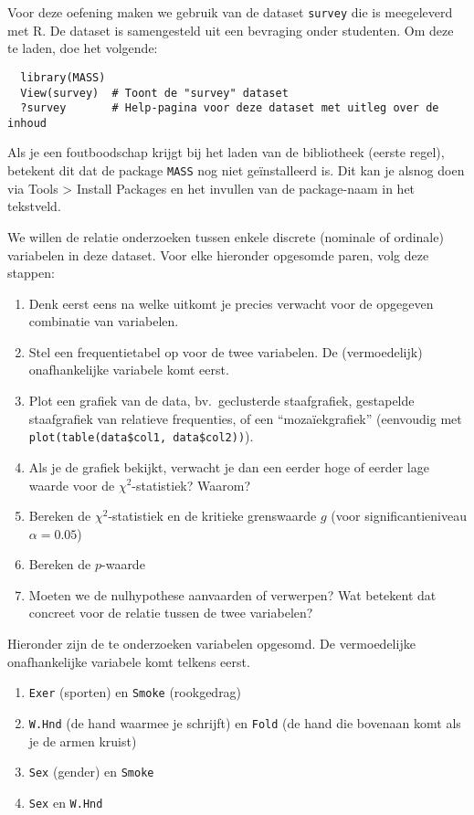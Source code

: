 \begin{exercise}
  \label{ex:chisq-survey}
  Voor deze oefening maken we gebruik van de dataset \texttt{survey} die is meegeleverd met R. De dataset is samengesteld uit een bevraging onder studenten. Om deze te laden, doe het volgende:
  
  \begin{lstlisting}
  library(MASS)
  View(survey)  # Toont de "survey" dataset
  ?survey       # Help-pagina voor deze dataset met uitleg over de inhoud
  \end{lstlisting}
  
  Als je een foutboodschap krijgt bij het laden van de bibliotheek (eerste regel), betekent dit dat de package \texttt{MASS} nog niet geïnstalleerd is. Dit kan je alsnog doen via Tools > Install Packages en het invullen van de package-naam in het tekstveld.
  
  We willen de relatie onderzoeken tussen enkele discrete (nominale of ordinale) variabelen in deze dataset. Voor elke hieronder opgesomde paren, volg deze stappen:
  
  \begin{enumerate}[label=(\alph*)]
    \item Denk eerst eens na welke uitkomt je precies verwacht voor de opgegeven combinatie van variabelen.
    \item Stel een frequentietabel op voor de twee variabelen. De (vermoedelijk) onafhankelijke variabele komt eerst.
    \item Plot een grafiek van de data, bv.~geclusterde staafgrafiek, gestapelde staafgrafiek van relatieve frequenties, of een ``mozaïekgrafiek'' (eenvoudig met \texttt{plot(table(data\$col1, data\$col2))}).
    \item Als je de grafiek bekijkt, verwacht je dan een eerder hoge of eerder lage waarde voor de $\chi^2$-statistiek? Waarom?
    \item Bereken de $\chi^2$-statistiek en de kritieke grenswaarde $g$ (voor significantieniveau $\alpha = 0.05$)
    \item Bereken de $p$-waarde
    \item Moeten we de nulhypothese aanvaarden of verwerpen? Wat betekent dat concreet voor de relatie tussen de twee variabelen?
  \end{enumerate}

  Hieronder zijn de te onderzoeken variabelen opgesomd. De vermoedelijke onafhankelijke variabele komt telkens eerst.
  
  \begin{enumerate}
    \item \texttt{Exer} (sporten) en \texttt{Smoke} (rookgedrag)
    \item \texttt{W.Hnd} (de hand waarmee je schrijft) en \texttt{Fold} (de hand die bovenaan komt als je de armen kruist)
    \item \texttt{Sex} (gender) en \texttt{Smoke}
    \item \texttt{Sex} en \texttt{W.Hnd}
  \end{enumerate}
\end{exercise}

